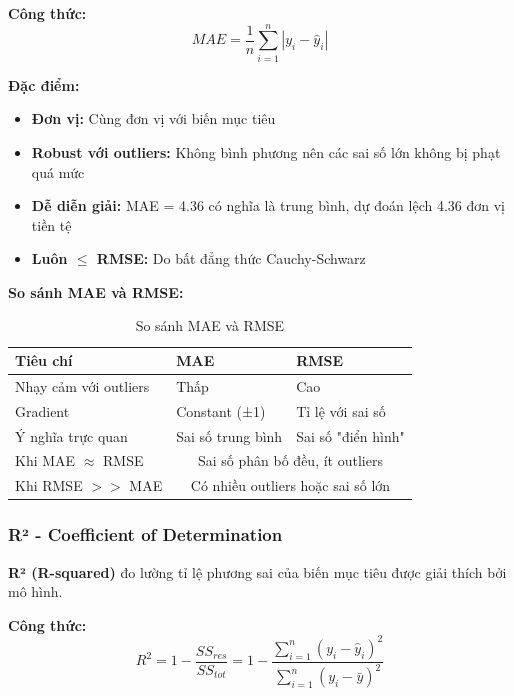 \documentclass[12pt,a4paper]{article}
\begin{document}
\textbf{Công thức:}
\begin{equation}
MAE = \frac{1}{n}\sum_{i=1}^{n}|y_i - \hat{y}_i|
\end{equation}

\textbf{Đặc điểm:}
\begin{itemize}
    \item \textbf{Đơn vị:} Cùng đơn vị với biến mục tiêu
    \item \textbf{Robust với outliers:} Không bình phương nên các sai số lớn không bị phạt quá mức
    \item \textbf{Dễ diễn giải:} MAE = 4.36 có nghĩa là trung bình, dự đoán lệch 4.36 đơn vị tiền tệ
    \item \textbf{Luôn $\leq$ RMSE:} Do bất đẳng thức Cauchy-Schwarz
\end{itemize}

\textbf{So sánh MAE và RMSE:}
\begin{table}[H]
\centering
\caption{So sánh MAE và RMSE}
\begin{tabular}{|l|p{6cm}|p{6cm}|}
\hline
\textbf{Tiêu chí} & \textbf{MAE} & \textbf{RMSE} \\
\hline
Nhạy cảm với outliers & Thấp & Cao \\
\hline
Gradient & Constant (±1) & Tỉ lệ với sai số \\
\hline
Ý nghĩa trực quan & Sai số trung bình & Sai số "điển hình" \\
\hline
Khi MAE $\approx$ RMSE & \multicolumn{2}{c|}{Sai số phân bố đều, ít outliers} \\
\hline
Khi RMSE $>>$ MAE & \multicolumn{2}{c|}{Có nhiều outliers hoặc sai số lớn} \\
\hline
\end{tabular}
\end{table}

\subsubsection{R² - Coefficient of Determination}

\begin{definitionbox}
\textbf{R² (R-squared)} đo lường tỉ lệ phương sai của biến mục tiêu được giải thích bởi mô hình.
\end{definitionbox}

\textbf{Công thức:}
\begin{equation}
R^2 = 1 - \frac{SS_{res}}{SS_{tot}} = 1 - \frac{\sum_{i=1}^{n}(y_i - \hat{y}_i)^2}{\sum_{i=1}^{n}(y_i - \bar{y})^2}
\end{equation}
\end{document}
